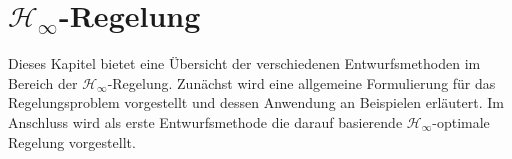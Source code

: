 \chapter{$\mathcal{H}_\infty$-Regelung}
Dieses Kapitel bietet eine Übersicht der verschiedenen Entwurfsmethoden im Bereich der $\mathcal{H}_\infty$-Regelung. Zunächst wird eine allgemeine Formulierung für das Regelungsproblem vorgestellt und dessen Anwendung an Beispielen erläutert. Im Anschluss wird als erste Entwurfsmethode die darauf basierende $\mathcal{H}_\infty$-optimale Regelung vorgestellt.

\newpage
